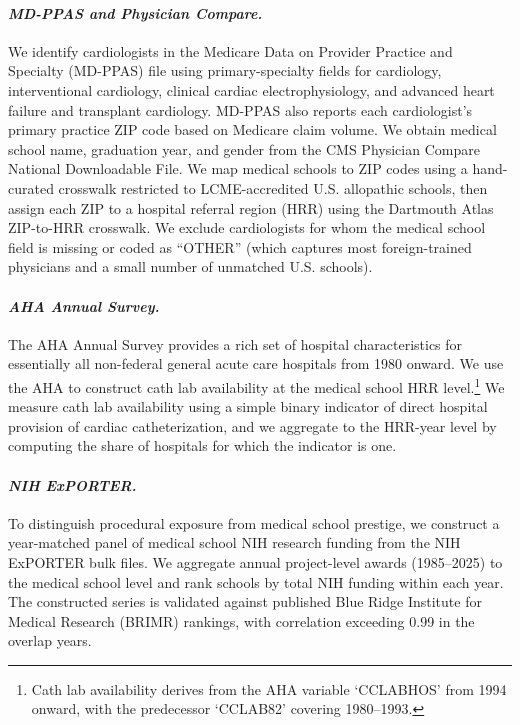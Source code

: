 \documentclass[12pt]{article}
\begin{document}
\paragraph{\textit{MD-PPAS and Physician Compare.}}
We identify cardiologists in the Medicare Data on Provider Practice and Specialty (MD-PPAS) file using primary-specialty fields for cardiology, interventional cardiology, clinical cardiac electrophysiology, and advanced heart failure and transplant cardiology. MD-PPAS also reports each cardiologist's primary practice ZIP code based on Medicare claim volume. We obtain medical school name, graduation year, and gender from the CMS Physician Compare National Downloadable File. We map medical schools to ZIP codes using a hand-curated crosswalk restricted to LCME-accredited U.S. allopathic schools, then assign each ZIP to a hospital referral region (HRR) using the Dartmouth Atlas ZIP-to-HRR crosswalk. We exclude cardiologists for whom the medical school field is missing or coded as ``OTHER'' (which captures most foreign-trained physicians and a small number of unmatched U.S. schools).

\paragraph{\textit{AHA Annual Survey.}}
The AHA Annual Survey provides a rich set of hospital characteristics for essentially all non-federal general acute care hospitals from 1980 onward. We use the AHA to construct cath lab availability at the medical school HRR level.\footnote{Cath lab availability derives from the AHA variable `CCLABHOS' from 1994 onward, with the predecessor `CCLAB82' covering 1980--1993.} We measure cath lab availability using a simple binary indicator of direct hospital provision of cardiac catheterization, and we aggregate to the HRR-year level by computing the share of hospitals for which the indicator is one.

\paragraph{\textit{NIH ExPORTER.}}
To distinguish procedural exposure from medical school prestige, we construct a year-matched panel of medical school NIH research funding from the NIH ExPORTER bulk files. We aggregate annual project-level awards (1985--2025) to the medical school level and rank schools by total NIH funding within each year. The constructed series is validated against published Blue Ridge Institute for Medical Research (BRIMR) rankings, with correlation exceeding 0.99 in the overlap years.
\end{document}
